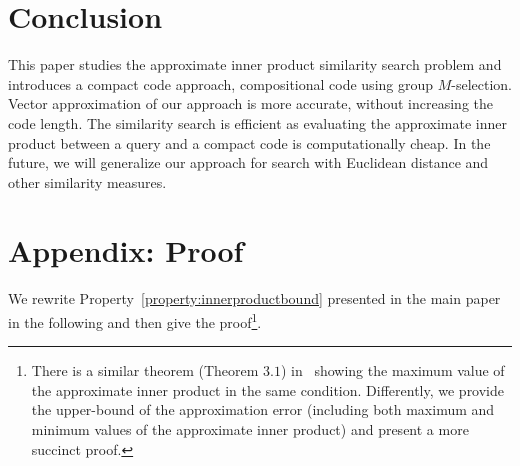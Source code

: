 \documentclass[10pt, letterpaper]{article}
\begin{document}
\section{Conclusion}
This paper
studies the approximate inner product similarity search problem
and introduces
a compact code approach,
compositional code using group $M$-selection.
Vector approximation of our approach
is more accurate,
without increasing the code length.
The similarity search is efficient
as
evaluating the approximate inner product
between a query and a compact code
is computationally cheap.
In the future,
we will generalize our approach
for search with Euclidean distance
and other similarity measures.


\section{Appendix: Proof}
We rewrite Property~\ref{property:innerproductbound} presented in the main paper
in the following
and then give the proof\footnote{There is a similar theorem (Theorem $3.1$) in~\cite{RamG12}
showing the maximum value of the approximate inner product
in the same condition.
Differently, we provide the upper-bound of the approximation error
(including both maximum and minimum values of the approximate inner product)
and present a more succinct proof.}.
\end{document}
